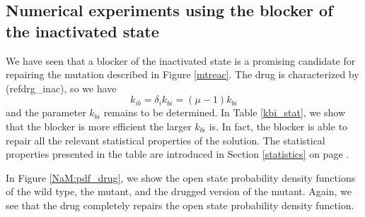 \subsection{Numerical experiments using the blocker of the inactivated state}
\label{numexp}
We have seen that a blocker of the inactivated state is a promising
candidate for repairing the mutation described in Figure \ref{mtreac}. The drug
is characterized by (ref{drg_inac}), so we have
\begin{equation}
k_{ib}=\delta_{i}k_{bi}=\left(  \mu-1\right)  k_{bi} \label{kbi10}
\end{equation}
and the parameter $k_{bi}$ remains to be determined. In Table \ref{kbi_stat}, we show that the
blocker is more efficient the larger $k_{bi}$ is. In fact, the blocker is able to
repair all the relevant statistical properties of the solution. The statistical properties
presented in the table are introduced in Section \ref{statistics} on page \pageref{statistics}.


In Figure \ref{NaM:pdf_drug}, we show the open state probability density functions of the
wild type, the mutant, and the drugged version of the mutant. Again, we see
that the drug completely repairs the open state probability density function.

